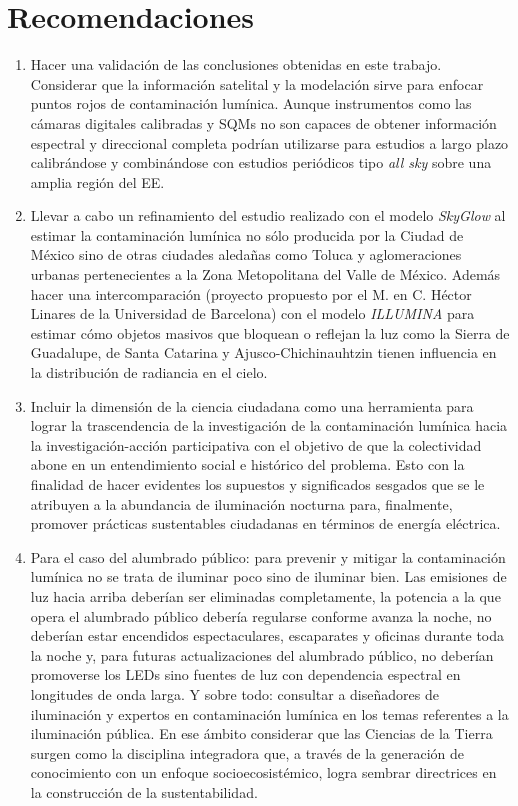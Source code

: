 \chapter{Recomendaciones}
\label{chap:recomendaciones}


\begin{enumerate}[I]

\item Hacer una validación de las conclusiones obtenidas en este trabajo. Considerar que la información satelital y la modelación sirve para enfocar puntos rojos de contaminación lumínica. Aunque instrumentos como las cámaras digitales calibradas y SQMs no son capaces de obtener información espectral y direccional completa podrían utilizarse para estudios a largo plazo calibrándose y combinándose con estudios periódicos tipo \textit{all sky} sobre una amplia región del EE.

\item Llevar a cabo un refinamiento del estudio realizado con el modelo \textit{SkyGlow} al estimar la contaminación lumínica no sólo producida por la Ciudad de México sino de otras ciudades aledañas como Toluca y aglomeraciones urbanas pertenecientes a la Zona Metopolitana del Valle de México. Además hacer una intercomparación (proyecto propuesto por el M. en C. Héctor Linares de la Universidad de Barcelona) con el modelo \textit{ILLUMINA} para estimar cómo objetos masivos que bloquean o reflejan la luz como la Sierra de Guadalupe, de Santa Catarina y Ajusco-Chichinauhtzin tienen influencia en la distribución de radiancia en el cielo.

\item Incluir la dimensión de la ciencia ciudadana como una herramienta para lograr la trascendencia de la investigación de la contaminación lumínica hacia la investigación-acción participativa con el objetivo de que la colectividad abone en un entendimiento social e histórico del problema. Esto con la finalidad de hacer evidentes los supuestos y significados sesgados que se le atribuyen a la abundancia de iluminación nocturna para, finalmente, promover prácticas sustentables ciudadanas en términos de energía eléctrica. 

\item Para el caso del alumbrado público: para prevenir y mitigar la contaminación lumínica no se trata de iluminar poco sino de iluminar bien. Las emisiones de luz hacia arriba deberían ser eliminadas completamente, la potencia a la que opera el alumbrado público debería regularse conforme avanza la noche, no deberían estar encendidos espectaculares, escaparates y oficinas durante toda la noche y, para futuras actualizaciones del alumbrado público, no deberían promoverse los LEDs sino fuentes de luz con dependencia espectral en longitudes de onda larga. Y sobre todo: consultar a diseñadores de iluminación y expertos en contaminación lumínica en los temas referentes a la iluminación pública. En ese ámbito considerar que las Ciencias de la Tierra surgen como la disciplina integradora que, a través de la generación de conocimiento con un enfoque socioecosistémico, logra sembrar directrices en la construcción de la sustentabilidad.


\end{enumerate}
